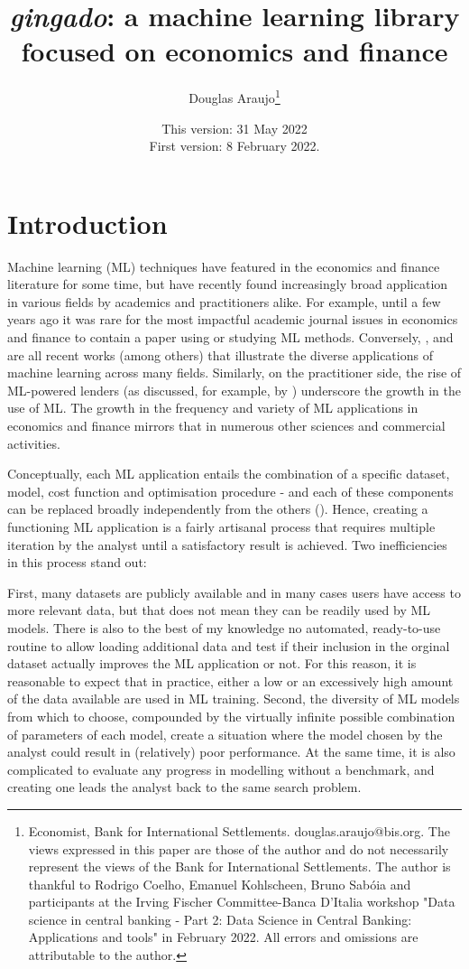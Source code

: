 \documentclass{article}
\title{\textit{gingado}: a machine learning library focused on economics and finance}
\author{Douglas Araujo\footnote{Economist, Bank for International Settlements. douglas.araujo@bis.org. The views expressed in this paper are those of the author and do not necessarily represent the views of the Bank for International Settlements. The author is thankful to Rodrigo Coelho, Emanuel Kohlscheen, Bruno Sabóia and participants at the Irving Fischer Committee-Banca D'Italia workshop "Data science in central banking - Part 2: Data Science in Central Banking: Applications and tools" in February 2022. All errors and omissions are attributable to the author.}}
\date{This version: 31 May 2022\\First version: 8 February 2022.}
\begin{document}
\maketitle

\section{Introduction}
Machine learning (ML) techniques have featured in the economics and finance literature for some time, but have recently found increasingly broad application in various fields by academics and practitioners alike. For example, until a few years ago it was rare for the most impactful academic journal issues in economics and finance to contain a paper using or studying ML methods. Conversely, \cite{Folklore}, \cite{MLMedicalError} and \cite{giannone2021illusion} are all recent works (among others) that illustrate the diverse applications of machine learning across many fields. Similarly, on the practitioner side, the rise of ML-powered lenders (as discussed, for example, by \cite{predunequal}) underscore the growth in the use of ML. The growth in the frequency and variety of ML applications in economics and finance mirrors that in numerous other sciences and commercial activities. 

Conceptually, each ML application entails the combination of a specific dataset, model, cost function and optimisation procedure - and each of these components can be replaced broadly independently from the others (\cite{DeepLearning}). Hence, creating a functioning ML application is a fairly artisanal process that requires multiple iteration by the analyst until a satisfactory result is achieved. Two inefficiencies in this process stand out:

First, many datasets are publicly available and in many cases users have access to more relevant data, but that does not mean they can be readily used by ML models. There is also to the best of my knowledge no automated, ready-to-use routine to allow loading additional data and test if their inclusion in the orginal dataset actually improves the ML application or not. For this reason, it is reasonable to expect that in practice, either a low or an excessively high amount of the data available are used in ML training. Second, the diversity of ML models from which to choose, compounded by the virtually infinite possible combination of parameters of each model, create a situation where the model chosen by the analyst could result in (relatively) poor performance. At the same time, it is also complicated to evaluate any progress in modelling without a benchmark, and creating one leads the analyst back to the same search problem.
\end{document}
